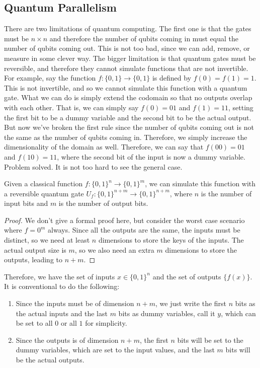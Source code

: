 \documentclass{article}
\begin{document}
  \subsection{Quantum Parallelism}

    There are two limitations of quantum computing. The first one is that the gates must be $n \times n$ and therefore the number of qubits coming in must equal the number of qubits coming out. This is not too bad, since we can add, remove, or measure in some clever way. The bigger limitation is that quantum gates must be reversible, and therefore they cannot simulate functions that are not invertible. For example, say the function $f: \{0, 1\} \longrightarrow \{0, 1\}$ is defined by $f(0) = f(1) = 1$. This is not invertible, and so we cannot simulate this function with a quantum gate. What we can do is simply extend the codomain so that no outputs overlap with each other. That is, we can simply say $f(0) = 01$ and $f(1) = 11$, setting the first bit to be a dummy variable and the second bit to be the actual output. But now we've broken the first rule since the number of qubits coming out is not the same as the number of qubits coming in. Therefore, we simply increase the dimensionality of the domain as well. Therefore, we can say that $f(00) = 01$ and $f(10) = 11$, where the second bit of the input is now a dummy variable. Problem solved. It is not too hard to see the general case. 

    \begin{lemma}
      Given a classical function $f: \{0, 1\}^n \longrightarrow \{0, 1\}^m$, we can simulate this function with a reversible quantum gate $U_f: \{0, 1\}^{n+m} \longrightarrow \{0, 1\}^{n+m}$, where $n$ is the number of input bits and $m$ is the number of output bits.
    \end{lemma}
    \begin{proof} 
      We don't give a formal proof here, but consider the worst case scenario where $f = 0^m$ always. Since all the outputs are the same, the inputs must be distinct, so we need at least $n$ dimensions to store the keys of the inputs. The actual output size is $m$, so we also need an extra $m$ dimensions to store the outputs, leading to $n + m$. 
    \end{proof}

    Therefore, we have the set of inputs $x \in \{0, 1\}^n$ and the set of outputs $\{f(x)\}$. It is conventional to do the following: 
    \begin{enumerate} 
      \item Since the inputs must be of dimension $n+m$, we just write the first $n$ bits as the actual inputs and the last $m$ bits as dummy variables, call it $y$, which can be set to all $0$ or all $1$ for simplicity.  
      \item Since the outputs is of dimension $n+m$, the first $n$ bits will be set to the dummy variables, which are set to the input values, and the last $m$ bits will be the actual outputs. 
    \end{enumerate}
\end{document}
